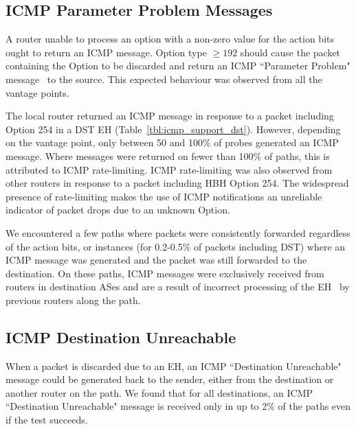\documentclass[conference]{IEEEtran}
\begin{document}
\subsection{ICMP Parameter Problem Messages}


A router unable to process an option with a non-zero value
for the action bits ought to return an ICMP message.
Option type $\ge 192$ should cause the packet containing the Option to be discarded and
return an ICMP ``Parameter Problem" message~\cite{rfc8200} to the source.
This expected behaviour was observed from all the vantage points. 

The local router returned an ICMP message in response to a packet including Option 254 in a DST EH
(Table~\ref{tbl:icmp_support_dst}).  However, depending on the vantage point, only between 50 and 100\% of
probes generated an ICMP message.
Where messages were returned on fewer than 100\% of paths, this is attributed to ICMP
rate-limiting.  ICMP rate-limiting was
also observed from other routers in response to a packet including HBH Option 254. The widespread presence of
rate-limiting makes the use of ICMP notifications an unreliable
indicator of packet drops due to an unknown Option.

We encountered a few paths where packets were consistently
forwarded regardless of the action bits, or instances (for 0.2-0.5\% of packets including DST) where an ICMP message
was generated and the packet was still forwarded to the destination. 
On these paths, ICMP messages were exclusively received from
routers in destination ASes and are a result of incorrect processing of the EH~\cite{rfc8200} by previous routers along the path.


\subsection{ICMP Destination Unreachable}

When a packet is discarded due to an EH, an ICMP ``Destination Unreachable"
message could be generated back to the sender, either from the destination or another router on the path.
We found that for all destinations, an ICMP
``Destination Unreachable" message is received only in up to 2\% of the paths
even if the test succeeds.  
\end{document}
